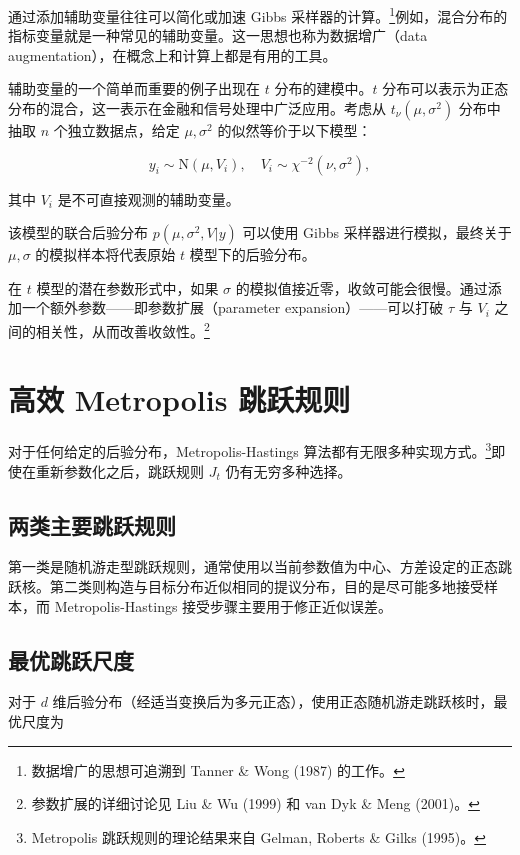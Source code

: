 通过添加辅助变量往往可以简化或加速 Gibbs 采样器的计算。\footnote{数据增广的思想可追溯到 Tanner \& Wong (1987) 的工作。}例如，混合分布的指标变量就是一种常见的辅助变量。这一思想也称为数据增广（data augmentation），在概念上和计算上都是有用的工具。

\begin{Example}[$t$ 分布的正态混合表示]
  辅助变量的一个简单而重要的例子出现在 $t$ 分布的建模中。$t$ 分布可以表示为正态分布的混合，这一表示在金融和信号处理中广泛应用。考虑从 $t_\nu(\mu, \sigma^2)$ 分布中抽取 $n$ 个独立数据点，给定 $\mu, \sigma^2$ 的似然等价于以下模型：

  \[
  y_i \sim \mathrm{N}(\mu, V_i), \quad V_i \sim \chi^{-2}(\nu, \sigma^2),
  \]

  其中 $V_i$ 是不可直接观测的辅助变量。
\end{Example}

该模型的联合后验分布 $p(\mu, \sigma^2, V | y)$ 可以使用 Gibbs 采样器进行模拟，最终关于 $\mu, \sigma$ 的模拟样本将代表原始 $t$ 模型下的后验分布。

在 $t$ 模型的潜在参数形式中，如果 $\sigma$ 的模拟值接近零，收敛可能会很慢。通过添加一个额外参数——即参数扩展（parameter expansion）——可以打破 $\tau$ 与 $V_i$ 之间的相关性，从而改善收敛性。\footnote{参数扩展的详细讨论见 Liu \& Wu (1999) 和 van Dyk \& Meng (2001)。}

\section{高效 Metropolis 跳跃规则}

对于任何给定的后验分布，Metropolis-Hastings 算法都有无限多种实现方式。\footnote{Metropolis 跳跃规则的理论结果来自 Gelman, Roberts \& Gilks (1995)。}即使在重新参数化之后，跳跃规则 $J_t$ 仍有无穷多种选择。

\subsection{两类主要跳跃规则}

第一类是随机游走型跳跃规则，通常使用以当前参数值为中心、方差设定的正态跳跃核。第二类则构造与目标分布近似相同的提议分布，目的是尽可能多地接受样本，而 Metropolis-Hastings 接受步骤主要用于修正近似误差。

\subsection{最优跳跃尺度}

对于 $d$ 维后验分布（经适当变换后为多元正态），使用正态随机游走跳跃核时，最优尺度为

